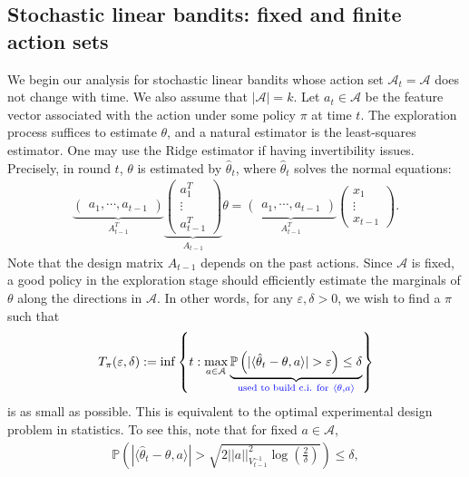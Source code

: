 \documentclass[10pt,a4paper]{amsart}
\numberwithin{equation}{section}
\theoremstyle{plain}
\theoremstyle{definition}
\def\P{{\mathbb P}}
\def\e{{\varepsilon}}
\def\t{{\theta}}
\begin{document}
\subsection{Stochastic linear bandits: fixed and finite action sets}

We begin our analysis for stochastic linear bandits whose action set $\mathcal A_t = \mathcal A$ does not change with time. We also assume that $|\mathcal A|=k$. Let $a_t\in\mathcal A$ be the feature vector associated with the action under some policy $\pi$ at time $t$. The exploration process suffices to estimate $\t$, and a natural estimator is the least-squares estimator. One may use the Ridge estimator if having invertibility issues. Precisely, in round $t$, $\t$ is estimated by $\hat{\t}_t$, where $\hat{\t}_t $ solves the normal equations: 
\begin{align*}
\underbrace{\begin{pmatrix}
a_1, \cdots, a_{t-1}
\end{pmatrix}}_{A^T_{t-1}}\underbrace{\begin{pmatrix}
a_1^T \\
\vdots \\
a_{t-1}^T
\end{pmatrix}}_{A_{t-1}}\t = \underbrace{\begin{pmatrix}
a_1, \cdots, a_{t-1}
\end{pmatrix}}_{A^T_{t-1}}\begin{pmatrix}
x_1 \\
\vdots \\
x_{t-1}
\end{pmatrix}.
\end{align*}
Note that the design matrix $A_{t-1}$ depends on the past actions. Since $\mathcal A$ is fixed, a good policy in the exploration stage should efficiently estimate the marginals of $\t$ along the directions in $\mathcal A$. In other words, for any $\e, \delta>0$, we wish to find a $\pi$ such that 
\begin{align}
T_{\pi}(\e, \delta):=\inf\left\{t: \max_{a\in\mathcal A}\underbrace{\P\left(|\langle\hat{\t}_t-\t, a\rangle|>\e\right)\leq\delta}_{\textcolor{blue}{\text{used to build c.i. for}\ \langle\t, a\rangle}}\right\}\label{sl:5}
\end{align}
is as small as possible. This is equivalent to the optimal experimental design problem in statistics. 
To see this, note that for fixed $a\in\mathcal A$, 
\begin{align*}
\P\left(|\langle\hat{\t}_t-\t, a\rangle|>\sqrt{2||a||^2_{V_{t-1}^{-1}}\log\left(\frac{2}{\delta}\right)}\right)\leq\delta,
\end{align*}
\end{document}
